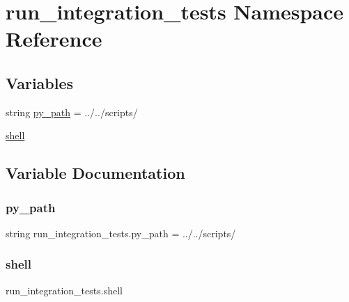 \hypertarget{namespacerun__integration__tests}{}\section{run\+\_\+integration\+\_\+tests Namespace Reference}
\label{namespacerun__integration__tests}
\subsection*{Variables}
\begin{DoxyCompactItemize}
\item 
string \hyperlink{namespacerun__integration__tests_af8c55fb004e43d9e8a5349698c092bd5}{py\+\_\+path} = \textquotesingle{}../../scripts/\textquotesingle{}
\item 
\hyperlink{namespacerun__integration__tests_a88c1f8c363b80db1c0ea47c5f581c56d}{shell}
\end{DoxyCompactItemize}


\subsection{Variable Documentation}
\mbox{\label{namespacerun__integration__tests_af8c55fb004e43d9e8a5349698c092bd5}} 
\subsubsection{\texorpdfstring{py\+\_\+path}{py\_path}}
{\footnotesize\ttfamily string run\+\_\+integration\+\_\+tests.\+py\+\_\+path = \textquotesingle{}../../scripts/\textquotesingle{}}

\mbox{\label{namespacerun__integration__tests_a88c1f8c363b80db1c0ea47c5f581c56d}} 
\subsubsection{\texorpdfstring{shell}{shell}}
{\footnotesize\ttfamily run\+\_\+integration\+\_\+tests.\+shell}

